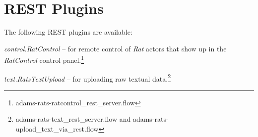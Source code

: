 \documentclass[a4paper]{book}
\begin{document}
\section{REST Plugins}
The following REST plugins are available:
\begin{tight_itemize}
  \item \textit{control.RatControl} -- for remote control of \textit{Rat} actors
  that show up in the \textit{RatControl} control
  panel.\footnote{adams-rats-ratcontrol\_rest\_server.flow}
  \item \textit{text.RatsTextUpload} -- for uploading raw textual
  data.\footnote{adams-rats-text\_rest\_server.flow and adams-rats-upload\_text\_via\_rest.flow}
\end{tight_itemize}


\end{document}
